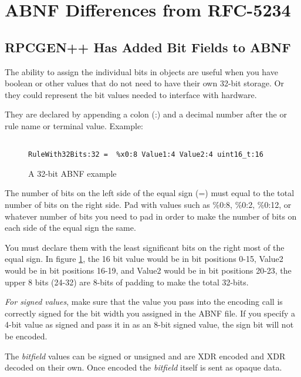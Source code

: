 \section{ABNF Differences from RFC-5234}

\subsection{RPCGEN++ Has Added Bit Fields to ABNF}
The ability to assign the individual bits in objects are useful
when you have boolean or other values that do not need to have
their own 32-bit storage.
Or they could represent the bit values needed to interface
with hardware.

They are declared by appending a colon (:) and a decimal number
after the or rule name or terminal value. Example:

\begin{figure}
\begin{verbatim}

RuleWith32Bits:32 =  %x0:8 Value1:4 Value2:4 uint16_t:16

\end{verbatim}
\caption{A 32-bit ABNF example}
\label{fig:A32BitExampleABNF}
\end{figure}

The number of bits on the left side of the equal sign (=)
must equal to the total number of bits on the right side.
Pad with values such as \%0:8, \%0:2, \%0:12, or whatever number
of bits you need to pad in order to make the number of bits
on each side of the equal sign the same.

You must declare them with the least significant bits on
the right most of the equal sign.
In figure \ref{fig:A32BitExampleABNF}, the 16 bit
value would be in bit positions 0-15, Value2 would
be in bit positions 16-19, and Value2 would be in bit
positions 20-23, the upper 8 bits (24-32) are 8-bits
of padding to make the total 32-bits.

\textit{For signed values}, make sure that the value you pass
into the encoding call is correctly signed for the bit
width you assigned in the ABNF file.
If you specify a 4-bit value as signed
and pass it in as an 8-bit signed value, the sign bit will not
be encoded.

The \textit{bitfield} values can be signed or unsigned and
are XDR encoded and XDR decoded on their own.
Once encoded the \textit{bitfield} itself is sent as
opaque data.

